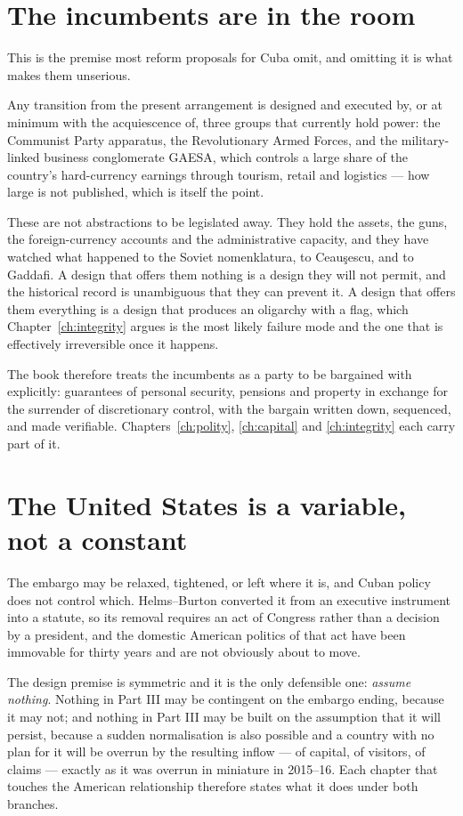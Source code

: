 \section{The incumbents are in the room}

This is the premise most reform proposals for Cuba omit, and omitting it is what
makes them unserious.

Any transition from the present arrangement is designed and executed by, or at
minimum with the acquiescence of, three groups that currently hold power: the
Communist Party apparatus, the Revolutionary Armed Forces, and the military-
linked business conglomerate GAESA, which controls a large share of the
country's hard-currency earnings through tourism, retail and logistics --- how
large is not published, which is itself the point.

These are not abstractions to be legislated away. They hold the assets, the
guns, the foreign-currency accounts and the administrative capacity, and they
have watched what happened to the Soviet nomenklatura, to Ceau\c{s}escu, and to
Gaddafi. A design that offers them nothing is a design they will not permit, and
the historical record is unambiguous that they can prevent it. A design that
offers them everything is a design that produces an oligarchy with a flag, which
Chapter~\ref{ch:integrity} argues is the most likely failure mode and the one
that is effectively irreversible once it happens.

The book therefore treats the incumbents as a party to be bargained with
explicitly: guarantees of personal security, pensions and property in exchange
for the surrender of discretionary control, with the bargain written down,
sequenced, and made verifiable. Chapters~\ref{ch:polity},
\ref{ch:capital} and \ref{ch:integrity} each carry part of it.

\section{The United States is a variable, not a constant}

The embargo may be relaxed, tightened, or left where it is, and Cuban policy
does not control which. Helms--Burton converted it from an executive instrument
into a statute, so its removal requires an act of Congress rather than a
decision by a president, and the domestic American politics of that act have
been immovable for thirty years and are not obviously about to move.

The design premise is symmetric and it is the only defensible one: \emph{assume
nothing}. Nothing in Part III may be contingent on the embargo ending, because
it may not; and nothing in Part III may be built on the assumption that it will
persist, because a sudden normalisation is also possible and a country with no
plan for it will be overrun by the resulting inflow --- of capital, of visitors,
of claims --- exactly as it was overrun in miniature in 2015--16. Each chapter
that touches the American relationship therefore states what it does under both
branches.

